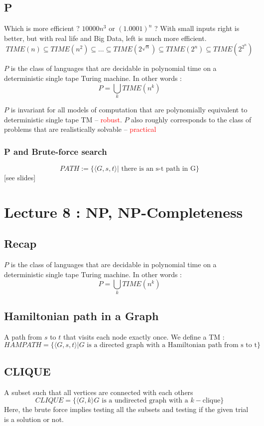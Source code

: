 \documentclass[12pt,a4paper]{article}
\newcommand{\<}{\langle}
\renewcommand{\>}{\rangle}
\begin{document}
\subsection{P}
Which is more efficient ? $10000n^3$ or $(1.0001)^n$ ? With small inputs right is better, but with real life and Big Data, left is much more efficient.
\[TIME(n) \subseteq TIME(n^2) \subseteq \ldots \subseteq TIME(2^{\sqrt{n}}) \subseteq TIME(2^n) \subseteq TIME(2^{2^n})\]
\begin{boite}
      $P$ is the class of languages that are decidable in polynomial time on a deterministic single tape Turing machine. In other words : 
     \[P = \bigcup_k TIME(n^k)\]
\end{boite}
$P$ is invariant for all models of computation that are polynomially equivalent to deterministic single tape TM -- \textcolor{red}{robust}. $P$ also roughly corresponds to the class of problems that are realistically solvable -- \textcolor{red}{practical}
\subsubsection{P and Brute-force search}
\[PATH := \{\<G,s,t\> | \text{ there is an s-t path in G}\}\]
[see slides]
\section{Lecture 8 : NP, NP-Completeness}
\subsection{Recap}
\begin{blackbox}
    $P$ is the class of languages that are decidable in polynomial time on a deterministic single tape Turing machine. In other words :
    \[P = \bigcup_k TIME(n^k)\]
\end{blackbox}

\subsection{Hamiltonian path in a Graph}
A path from $s$ to $t$ that visits each node exactly once. We define a TM :
\[HAMPATH = \{\langle G,s,t\rangle | G \text{ is a directed graph with a Hamiltonian path from s to t}\}\]
\subsection{CLIQUE} 
A subset such that all vertices are connected with each others
\[CLIQUE = \{\langle G, k \rangle G \text{ is a undirected graph with a $k-$clique}\}\]
Here, the brute force implies testing all the subsets and testing if the given trial is a solution or not. 
\end{document}
